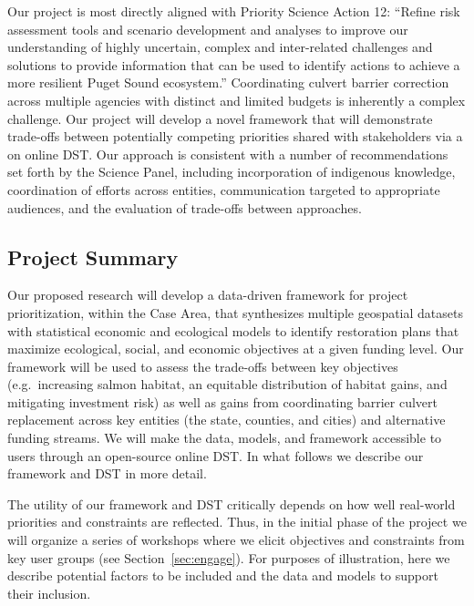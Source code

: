 \documentclass[12pt]{elsarticle}
\begin{document}
	Our project is most directly aligned with Priority Science Action 12: ``Refine risk assessment tools and scenario development and analyses to improve our understanding of highly uncertain, complex and inter-related challenges and solutions to provide information that can be used to identify actions to achieve a more resilient Puget Sound ecosystem.'' Coordinating culvert barrier correction across multiple agencies with distinct and limited budgets is inherently a complex challenge. Our project will develop a novel framework that will demonstrate trade-offs between potentially competing priorities shared with stakeholders via a on online DST. Our approach is consistent with a number of recommendations set forth by the Science Panel, including incorporation of indigenous knowledge, coordination of efforts across entities, communication targeted to appropriate audiences, and the evaluation of trade-offs between approaches.
	
	\subsection{Project Summary}\label{sec:summary} %
	
	Our proposed research will develop a data-driven framework for project prioritization, within the Case Area, that synthesizes multiple geospatial datasets with statistical economic and ecological models to identify restoration plans that maximize ecological, social, and economic objectives at a given funding level. Our framework will be used to assess the trade-offs between key objectives (e.g.\ increasing salmon habitat, an equitable distribution of habitat gains, and mitigating investment risk) as well as gains from coordinating barrier culvert replacement across key entities (the state, counties, and cities) and alternative funding streams. We will make the data, models, and framework accessible to users through an open-source online DST. In what follows we describe our framework and DST in more detail.
	
	The utility of our framework and DST critically depends on how well real-world priorities and constraints are reflected. Thus, in the initial phase of the project we will organize a series of workshops where we elicit objectives and constraints from key user groups (see Section~\ref{sec:engage}). For purposes of illustration, here we describe potential factors to be included and the data and models to support their inclusion.   
	
\end{document}
